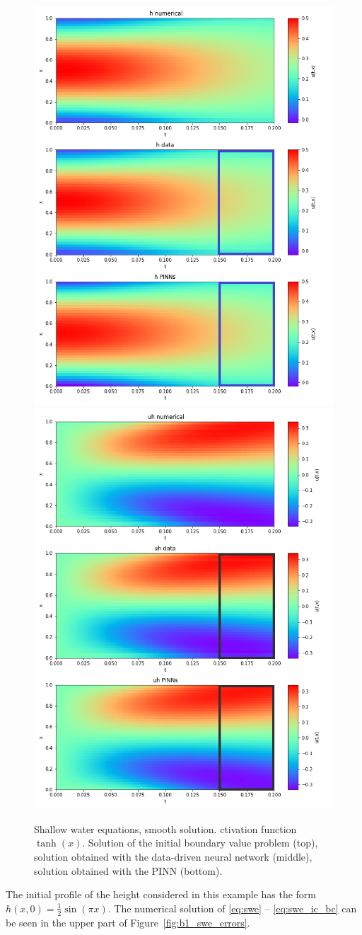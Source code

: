 \begin{figure}[t!]
\begin{center}
\includegraphics[width=0.45\linewidth]{./plots/h_colormap_b1.png}
\includegraphics[width=0.45\linewidth]{./plots/uh_colormap_b1.png}
\end{center}
\caption{Shallow water equations, smooth solution. ctivation function $\tanh(x)$. Solution of 
the initial boundary value problem (top), solution obtained with the data-driven neural network (middle), 
solution obtained with the PINN (bottom).}
\label{fig:b1_swe_sol}
\end{figure}

The initial profile of the height considered in this example has the form  $h(x,0) =\frac{1}{2} \sin (\pi x)$.
The numerical solution of  \eqref{eq:swe} -- \eqref{eq:swe_ic_bc} can be seen in the upper part of 
Figure~\ref{fig:b1_swe_errors}.

